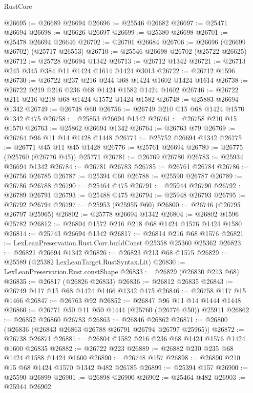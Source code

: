 \begin{lexlean}{RustCore}
\begin{coremodule}
@26695 := @26689 @26694
@26696 := @25546 @26682
@26697 := @25471 @26694
@26698 := @26626 @26697
@26699 := @25380 @26698
@26701 := @25478 @26694 @26646
@26702 := @26701 @26684
@26706 := @26696 (@26699 @26702) (@25717 @26553)
@26710 := @25546 @26698 @26702 (@25722 @26625)
@26712 := @25728 @26694 @1342
@26713 := @26712 @1342
@26721 := @26713 @245 @345 @384 @11 @1424 @1614 @1424 @3013
@26722 := @26712 @1596
@26730 := @26722 @237 @216 @244 @68 @1424 @1602 @1424 @1614
@26738 := @26722 @219 @216 @236 @68 @1424 @1582 @1424 @1602
@26746 := @26722 @211 @216 @218 @68 @1424 @1572 @1424 @1582
@26748 := @25883 @26694 @1342
@26749 := @26748 @60
@26756 := @26749 @210 @15 @68 @1424 @1570 @1342 @475
@26758 := @25853 @26694 @1342
@26761 := @26758 @210 @15 @1570
@26763 := @25862 @26694 @1342
@26764 := @26763 @79
@26769 := @26764 @96 @11 @14 @1428 @1448
@26771 := @25752 @26694 @1342
@26775 := @26771 @45 @11 @45 @1428
@26776 := @25761 @26694
@26780 := @26775 (@25760 (@26776 @45)) @25771
@26781 := @26769 @26780
@26783 := @25934 @26694 @1342
@26784 := @26781 @26783
@26785 := @26761 @26784
@26786 := @26756 @26785
@26787 := @25394 @60
@26788 := @25590 @26787
@26789 := @26786 @26788
@26790 := @25464 @475
@26791 := @25944 @26790
@26792 := @26789 @26791
@26793 := @25488 @475
@26794 := @25948 @26793
@26795 := @26792 @26794
@26797 := @25953 (@25955 @60)
@26800 := @26746 (@26795 @26797 @25965)
@26802 := @25778 @26694 @1342
@26804 := @26802 @1596 @25782
@26812 := @26804 @1572 @216 @218 @68 @1424 @1576 @1424 @1580
@26814 := @25743 @26694 @1342
@26817 := @26814 @216 @68 @1576
@26821 := LexLeanPreservation.Rust.Corr.buildConst @25358 @25360 @25362
@26823 := @26821 @26694 @1342
@26826 := @26823 @213 @68 @1575
@26829 := @25589 (@25382 LexLeanTarget.RustSyntax.Lit)
@26830 := LexLeanPreservation.Rust.constShape
@26833 := @26829 (@26830 @213 @68)
@26835 := @26817 (@26826 @26833)
@26836 := @26812 @26835
@26843 := @26749 @117 @15 @68 @1424 @1466 @1342 @475
@26846 := @26758 @117 @15 @1466
@26847 := @26763 @92
@26852 := @26847 @96 @11 @14 @1444 @1448
@26860 := @26771 @50 @11 @50 @1444 (@25760 (@26776 @50)) @25911
@26862 := @26852 @26860 @26783
@26863 := @26846 @26862
@26871 := @26800 (@26836 (@26843 @26863 @26788 @26791 @26794 @26797 @25965))
@26872 := @26738 @26871
@26881 := @26804 @1582 @216 @236 @68 @1424 @1576 @1424 @1600 @26835
@26882 := @26722 @223
@26889 := @26882 @230 @235 @68 @1424 @1588 @1424 @1600
@26890 := @26748 @157
@26898 := @26890 @210 @15 @68 @1424 @1570 @1342 @482 @26785
@26899 := @25394 @157
@26900 := @25590 @26899
@26901 := @26898 @26900
@26902 := @25464 @482
@26903 := @25944 @26902

\end{coremodule}
\end{lexlean}
